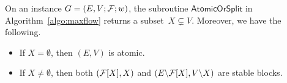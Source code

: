 \begin{lemma}\label{lem:maxflow}
	On an instance $G = (E, V; \mathcal {F}; w)$, 
	the subroutine $\mathsf{AtomicOrSplit}$ in
	Algorithm~\ref{algo:maxflow} returns a subset~$X \subsetneq V$.
	Moreover, we have the following.
	
	\begin{itemize}
		\item If $X = \emptyset$, then $(E, V)$ is atomic.
		\item If $X \neq \emptyset$, then both $(\mathcal {F}[X], X)$ and $(E \backslash \mathcal {F}[X], V \backslash X)$ are stable blocks.
	\end{itemize}
\end{lemma}

